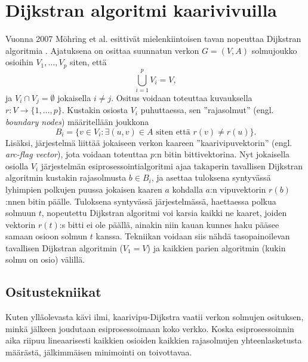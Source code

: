 \documentclass[finnish]{tktltiki2}
\theoremstyle{definition}
\theoremstyle{remark}
\begin{document}
\section{Dijkstran algoritmi kaarivivuilla}
\label{sec:arcflags}
Vuonna 2007 Möhring et al. esittivät mielenkiintoisen tavan nopeuttaa Dijkstran algoritmia \cite{Mohring07}. Ajatuksena on osittaa suunnatun verkon $G=(V, A)$ solmujoukko osioihin $V_1, \dots, V_p$ siten, että
\[
\bigcup_{i = 1}^p V_i = V,
\]
ja $V_i \cap V_j = \emptyset$ jokaisella $i \neq j$. Ositus voidaan toteuttaa kuvauksella $r \colon V \to \{1, \dots, p\}$. Kustakin osiosta $V_i$ puhuttaessa, sen ''rajasolmut'' (engl. \textit{boundary nodes}) määritellään joukkona
\[
B_i = \{ v \in V_i \colon \exists(u, v) \in A \text{ siten että } r(v) \neq r(u) \}.
\]
Lisäksi, järjestelmä liittää jokaiseen verkon kaareen ''kaarivipuvektorin'' (engl. \textit{arc-flag vector}), jota voidaan toteuttaa $p$:n bitin bittivektorina. Nyt jokaisella osiolla $V_i$ järjestelmän esiprosessointialgoritmi ajaa takaperin tavallisen Dijkstran algoritmin kustakin rajasolmusta $b \in B_i$, ja asettaa tuloksena syntyvässä lyhimpien polkujen puussa jokaisen kaaren $a$ kohdalla $a$:n vipuvektorin $r(b)$:nnen bitin päälle. Tuloksena syntyvässä järjestelmässä, haettaessa polkua solmuun $t$, nopeutettu Dijkstran algoritmi voi karsia kaikki ne kaaret, joiden vektorin $r(t)$:s bitti ei ole päällä, ainakin niin kauan kunnes haku pääsee samaan osioon solmun $t$ kanssa. Tekniikan voidaan siis nähdä tasopainoilevan tavallisen Dijkstran algoritmin ($V_1 = V$) ja kaikkien parien algoritmin (kukin solmu on osio) välillä.

\subsection{Ositustekniikat}
 Kuten ylläolevasta kävi ilmi, kaarivipu-Dijkstra vaatii verkon solmujen osituksen, minkä jälkeen joudutaan esiprosessoimaan koko verkko. Koska esiprosessoinnin aika riipuu lineaarisesti kaikkien osioiden kaikkien rajasolmujen yhteenlasketusta määrästä, jälkimmäisen minimointi on toivottavaa. 
 
\end{document}
